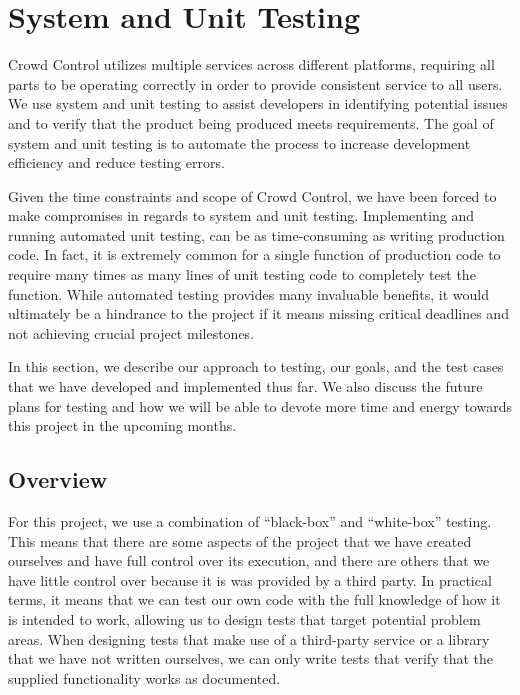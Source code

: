 \renewcommand{\arraystretch}{1.5}

\chapter{System and Unit Testing}

Crowd Control utilizes multiple services across different platforms, requiring
all parts to be operating correctly in order to provide consistent service to
all users. We use system and unit testing to assist developers in identifying 
potential issues and to verify that the product being produced meets
requirements. The goal of system and unit testing is to automate the process to
increase development efficiency and reduce testing errors.

Given the time constraints and scope of Crowd Control, we have been forced to
make compromises in regards to system and unit testing. Implementing and running
automated unit testing, can be as time-consuming as writing production code. In
fact, it is extremely common for a single function of production code to require
many times as many lines of unit testing code to completely test the function.
While automated testing provides many invaluable benefits, it would ultimately be
a hindrance to the project if it means missing critical deadlines and not
achieving crucial project milestones.

In this section, we describe our approach to testing, our goals, and the test
cases that we have developed and implemented thus far. We also discuss the
future plans for testing and how we will be able to devote more time and energy
towards this project in the upcoming months.


\section{Overview}

For this project, we use a combination of ``black-box'' and ``white-box''
testing. This means that there are some aspects of the project that we have
created ourselves and have full control over its execution, and there are others
that we have little control over because it is was provided by a third party.
In practical terms, it means that we can test our own code with the full
knowledge of how it is intended to work, allowing us to design tests that target
potential problem areas. When designing tests that make use of a third-party
service or a library that we have not written ourselves, we can only write tests
that verify that the supplied functionality works as documented.

